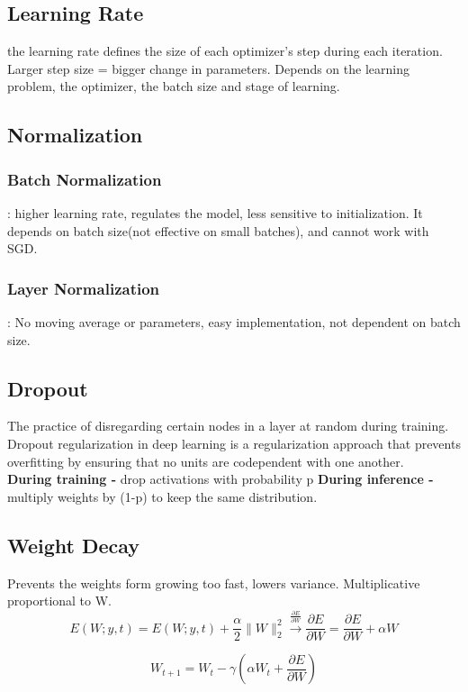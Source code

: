 \documentclass[11pt, english]{article}
\begin{document}
\subsection{Learning Rate}
 the learning rate defines the size of each optimizer's step during each iteration. 
 Larger step size = bigger change in parameters.
 Depends on the learning problem, the optimizer, the batch size and stage of learning.
\subsection{Normalization}
\subsubsection{Batch Normalization}: higher learning rate, regulates the model, less sensitive to initialization. It depends on batch size(not effective on small batches), and cannot work with SGD.
\subsubsection{Layer Normalization}: No moving average or parameters, easy implementation, not dependent on batch size. 
\subsection{Dropout}
The practice of disregarding certain nodes in a layer at random during training. Dropout regularization in deep learning is a regularization approach that prevents overfitting by ensuring that no units are codependent with one another. \\
\textbf{During training - }drop activations with probability p
\textbf{During inference -} multiply weights by (1-p) to keep the same distribution.
\subsection{Weight Decay}
Prevents the weights form growing too fast, lowers variance. Multiplicative proportional to W.
\[
E(W; y, t) = E(W; y, t) + \frac{\alpha}{2} \| W \|_2^2 \xrightarrow{\frac{\partial E}{\partial W}} \frac{\partial E}{\partial W} = \frac{\partial E}{\partial W} + \alpha W
\]

\[
W_{t+1} = W_t - \gamma \left( \alpha W_t + \frac{\partial E}{\partial W} \right)
\]
\end{document}
